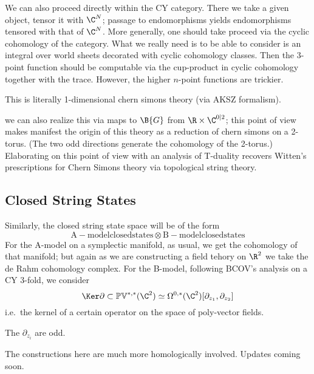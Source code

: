 \documentclass[12pt]{amsart}
\begin{document}
\begin{rmk}
  We can also proceed directly within the CY category. There we take a given
  object, tensor it with $\C^N$; passage to endomorphisms yields
  endomorphisms tensored with that of $\C^N$. More generally, one should take
  proceed via the cyclic cohomology of the category. What we really need is
  to be able to consider is an integral over world sheets decorated with
  cyclic cohomology classes. Then the 3-point function should be computable
  via the cup-product in cyclic cohomology together with the trace. However,
  the higher $n$-point functions are trickier.
\end{rmk}

\begin{rmk}
  This is literally 1-dimensional chern simons theory (via AKSZ formalism).
\end{rmk}

\begin{rmk}
  we can also realize this via maps to $\B{G}$ from $\R\times \C^{0|2}$; this
  point of view makes manifest the origin of this theory as a reduction of chern simons on a
2-torus. (The two odd directions generate the cohomology of the 2-torus.)
Elaborating on this point of view with an analysis of T-duality recovers
Witten's prescriptions for Chern Simons theory via topological string theory.
\end{rmk}

\subsection{Closed String States}
Similarly, the closed string state space will be of the form
$$\mathrm{A-model closed states}\otimes \mathrm{B-model closed
states}$$
For the A-model on a symplectic manifold, as usual, we get the cohomology of
that manifold; but again as we are constructing a field tehory on $\R^2$ we
take the de Rahm cohomology complex.
For the B-model, following BCOV's analysis on a CY 3-fold, we consider $$\Ker \partial \subset
\mbf{PV}^{*,*}(\C^2) \simeq
\Omega^{0,*}(\C^2)[\partial_{z_1},\partial_{z_2}]$$
i.e.\ the kernel of a certain operator on the space of poly-vector fields.
\begin{rmk}
  The $\partial_{z_i}$ are odd.
\end{rmk}

\begin{rmk}
  The constructions here are much more homologically involved. Updates coming soon.
\end{rmk}
\end{document}
